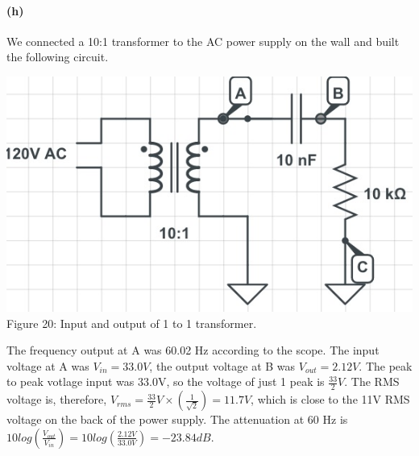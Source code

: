 \documentclass[]{article}
\begin{document}
	\paragraph{ (h)}
	We connected a 10:1 transformer to the AC power supply on the wall and built the following circuit. 
		\begin{center}
			\includegraphics[scale=0.4]{h_transf}\\
			Figure 20: Input and output of 1 to 1 transformer.
		\end{center}
The frequency output at A was 60.02 Hz according to the scope. The input voltage at A was $V_{in}=33.0V$, the output voltage at B was $V_{out}=2.12V$. The peak to peak votlage input was 33.0V,  so the voltage of just 1 peak is $\frac{33}{2}V$. The RMS voltage is, therefore, $V_{rms}=\frac{33}{2}V \times (\frac{1}{\sqrt{2}})=11.7V$, which is close to the 11V RMS voltage on the back of the power supply. The attenuation at 60 Hz is $10log(\frac{V_{out}}{V_{in}})=10log(\frac{2.12V}{33.0V})=-23.84 dB$. 
	
\end{document}
